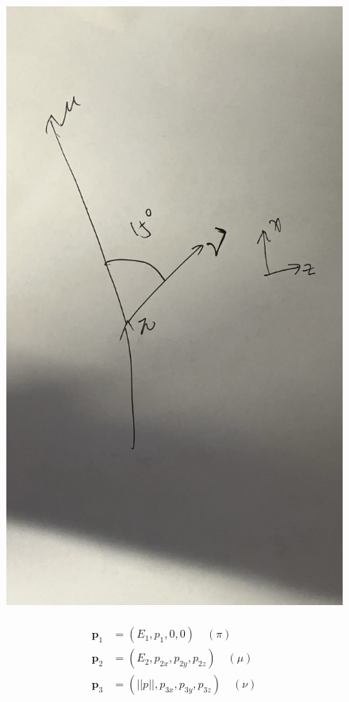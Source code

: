 \documentclass{article}
\begin{document}
\begin{itemize}
\begin{itemize}
\begin{figure}[h]
            \includegraphics[scale=0.08]{figure/phys225_hw11_fig1_alt.jpeg}
        \end{figure}
        \begin{align*}
            \\
            \mathbf{p}_1&=(E_1,p_1,0,0)\quad (\pi)\\
            \mathbf{p}_2&=(E_2,p_{2x},p_{2y},p_{2z})\quad (\mu)\\
            \mathbf{p}_3&=(||p||,p_{3x},p_{3y},p_{3z}) \quad (\nu)\\

\end{align*}
\end{itemize}
\end{itemize}
\end{document}
